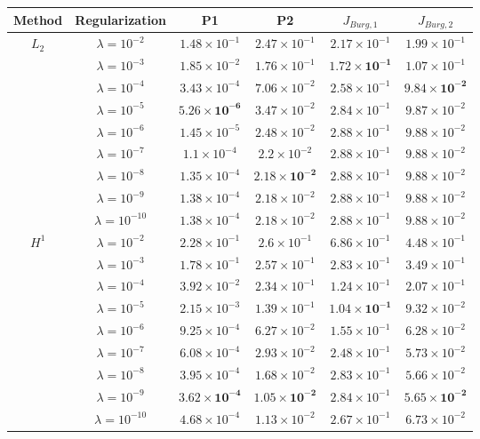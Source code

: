 \documentclass[final,1p,times]{elsarticle}
\theoremstyle{plain} %
\theoremstyle{definition} %
\theoremstyle{remark} %
\begin{document}
\begin{table}[h]
\begin{tabular}{c c cccc}
\toprule
Method & Regularization & P1 & P2 & $J_{Burg,1}$ & $J_{Burg,2}$ \\
\midrule
\multirow{9}{*}{$L_2$} & $\lambda=10^{-2}$ & $1.48\times 10^{-1}$ & $2.47\times 10^{-1}$ & $2.17\times 10^{-1}$ & $1.99\times 10^{-1}$ \\
 & $\lambda=10^{-3}$ & $1.85\times 10^{-2}$ & $1.76\times 10^{-1}$ & $\bm{1.72\times 10^{-1}}$ & $1.07\times 10^{-1}$ \\
 & $\lambda=10^{-4}$ & $3.43\times 10^{-4}$ & $7.06\times 10^{-2}$ & $2.58\times 10^{-1}$ & $\bm{9.84\times 10^{-2}}$ \\
 & $\lambda=10^{-5}$ & $\bm{5.26\times 10^{-6}}$ & $3.47\times 10^{-2}$ & $2.84\times 10^{-1}$ & $9.87\times 10^{-2}$ \\
 & $\lambda=10^{-6}$ & $1.45\times 10^{-5}$ & $2.48\times 10^{-2}$ & $2.88\times 10^{-1}$ & $9.88\times 10^{-2}$ \\
 & $\lambda=10^{-7}$ & $1.1\times 10^{-4}$ & $2.2\times 10^{-2}$ & $2.88\times 10^{-1}$ & $9.88\times 10^{-2}$ \\
 & $\lambda=10^{-8}$ & $1.35\times 10^{-4}$ & $\bm{2.18\times 10^{-2}}$ & $2.88\times 10^{-1}$ & $9.88\times 10^{-2}$ \\
 & $\lambda=10^{-9}$ & $1.38\times 10^{-4}$ & $2.18\times 10^{-2}$ & $2.88\times 10^{-1}$ & $9.88\times 10^{-2}$ \\
 & $\lambda=10^{-10}$ & $1.38\times 10^{-4}$ & $2.18\times 10^{-2}$ & $2.88\times 10^{-1}$ & $9.88\times 10^{-2}$ \\
\midrule
\multirow{9}{*}{$H^1$} & $\lambda=10^{-2}$ & $2.28\times 10^{-1}$ & $2.6\times 10^{-1}$ & $6.86\times 10^{-1}$ & $4.48\times 10^{-1}$ \\
 & $\lambda=10^{-3}$ & $1.78\times 10^{-1}$ & $2.57\times 10^{-1}$ & $2.83\times 10^{-1}$ & $3.49\times 10^{-1}$ \\
 & $\lambda=10^{-4}$ & $3.92\times 10^{-2}$ & $2.34\times 10^{-1}$ & $1.24\times 10^{-1}$ & $2.07\times 10^{-1}$ \\
 & $\lambda=10^{-5}$ & $2.15\times 10^{-3}$ & $1.39\times 10^{-1}$ & $\bm{1.04\times 10^{-1}}$ & $9.32\times 10^{-2}$ \\
 & $\lambda=10^{-6}$ & $9.25\times 10^{-4}$ & $6.27\times 10^{-2}$ & $1.55\times 10^{-1}$ & $6.28\times 10^{-2}$ \\
 & $\lambda=10^{-7}$ & $6.08\times 10^{-4}$ & $2.93\times 10^{-2}$ & $2.48\times 10^{-1}$ & $5.73\times 10^{-2}$ \\
 & $\lambda=10^{-8}$ & $3.95\times 10^{-4}$ & $1.68\times 10^{-2}$ & $2.83\times 10^{-1}$ & $5.66\times 10^{-2}$ \\
 & $\lambda=10^{-9}$ & $\bm{3.62\times 10^{-4}}$ & $\bm{1.05\times 10^{-2}}$ & $2.84\times 10^{-1}$ & $\bm{5.65\times 10^{-2}}$ \\
 & $\lambda=10^{-10}$ & $4.68\times 10^{-4}$ & $1.13\times 10^{-2}$ & $2.67\times 10^{-1}$ & $6.73\times 10^{-2}$ \\
\bottomrule
\end{tabular}
\end{table}
\end{document}
